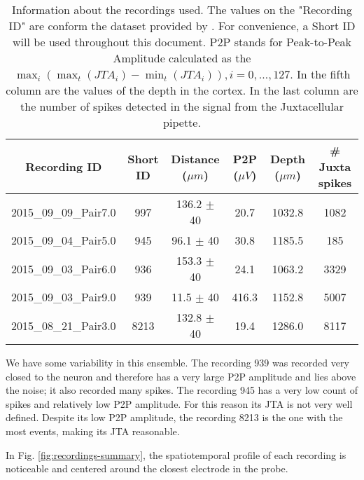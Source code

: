 \begin{table}[!h]
\centering
\begin{tabular}{cccccc}
\textbf{Recording ID} & \textbf{Short ID} & \textbf{Distance ($\mu m$) } & \textbf{P2P ($\mu V$)} & \textbf{Depth ($\mu m$)} & \textbf{\# Juxta spikes}\\ \hline
2015\_09\_09\_Pair7.0 & 997 & 136.2 $\pm$ 40 & 20.7 & 1032.8 & 1082  \\ 
2015\_09\_04\_Pair5.0 & 945 & 96.1 $\pm$ 40 & 30.8 & 1185.5 & 185  \\
2015\_09\_03\_Pair6.0 & 936 & 153.3 $\pm$  40 & 24.1 & 1063.2 & 3329 \\
2015\_09\_03\_Pair9.0 & 939 & 11.5 $\pm$  40 & 416.3 & 1152.8 & 5007  \\
2015\_08\_21\_Pair3.0 & 8213 & 132.8 $\pm$ 40 & 19.4 & 1286.0 & 8117 \\ 
\end{tabular}
\caption{Information about the recordings used. The values on the "Recording ID" are conform the dataset provided by \cite{Netoetal}. For convenience, a Short ID will be used throughout this document. P2P stands for Peak-to-Peak Amplitude calculated as the $\max_i \left( \max_t \left( JTA_i \right) - \min_t \left( JTA_i \right)\right), i=0,\ldots , 127$. In the fifth column are the values of the depth in the cortex. In the last column are the number of spikes detected in the signal from the Juxtacellular pipette.}
\label{tab:sum-recordings}
\end{table}

We have some variability in this ensemble. 
The recording 939 was recorded very closed to the neuron and therefore has a very large P2P amplitude and lies above the noise; it also recorded many spikes. 
The recording 945 has a very low count of spikes and relatively low P2P amplitude. For this reason its JTA is not very well defined.
Despite its low P2P amplitude, the recording 8213 is the one with the most events, making its JTA reasonable.

In Fig. \ref{fig:recordings-summary}, the spatiotemporal profile of each recording is noticeable and centered around the closest electrode in the probe.
